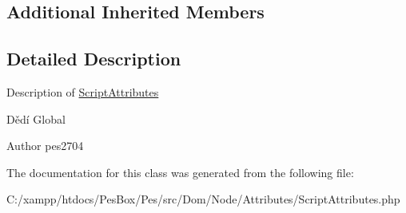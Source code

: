 \subsection*{Additional Inherited Members}


\subsection{Detailed Description}
Description of \mbox{\hyperlink{class_pes_1_1_dom_1_1_node_1_1_attributes_1_1_script_attributes}{Script\+Attributes}}

Dědí Global

\begin{DoxyAuthor}{Author}
pes2704 
\end{DoxyAuthor}


The documentation for this class was generated from the following file\+:\begin{DoxyCompactItemize}
\item 
C\+:/xampp/htdocs/\+Pes\+Box/\+Pes/src/\+Dom/\+Node/\+Attributes/Script\+Attributes.\+php\end{DoxyCompactItemize}
